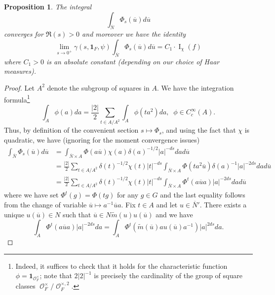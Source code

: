 \documentclass[12pt]{article}
\newtheorem{prop}{Proposition}[section]
\numberwithin{equation}{section}
\def\tm{\widetilde{m}}
\def\ou{\overline{u}}
\def\oN{\overline{N}}
\DeclareMathOperator{\cO}{\mathcal{O}}
\DeclareMathOperator{\rI}{\mathrm{I}}
\begin{document}
	\begin{prop}\label{prop}
		The integral
		\begin{equation}\label{eq4}
			\displaystyle \int_{\oN} \Phi_s(\ou) d\ou
		\end{equation}
		converges for $\Re(s)>0$ and moreover we have the identity
		$$\displaystyle \lim\limits_{s\to 0^+} \gamma(s,\mathbf{1}_F,\psi) \int_{\oN} \Phi_s(\ou)d\ou =C_1 \cdot \rI_{\chi}(f)$$
		where $C_1>0$ is an absolute constant (depending on our choice of Haar measures). 
	\end{prop}
	
	\begin{proof}
		Let $A^2$ denote the subgroup of squares in $A$. We have the integration formula\footnote{Indeed, it suffices to check that it holds for the characteristic function $\phi=\mathbf{1}_{\cO_F^\times}$; note that $2\lvert 2\rvert^{-1}$ is precisely the cardinality of the group of square classes $\cO_F^\times/\cO_F^{\times,2}$.}
		$$\displaystyle \int_A \phi(a)da=\frac{\lvert 2\rvert}{2}\sum_{t\in A/A^2} \int_A \phi(ta^2) da,\;\; \phi\in C_c^\infty(A).$$
		Thus, by definition of the convenient section $s\mapsto \Phi_s$, and using the fact that $\chi$ is quadratic, we have (ignoring for the moment convergence issues)
		\begin{align}\label{eq3}
			\displaystyle \int_{\oN} \Phi_s(\ou) d\ou & =\int_{\oN\times A} \Phi(a\ou) \chi(a)\delta(a)^{-1/2} \lvert a\rvert^{-ds} dad\ou \\
			\nonumber & = \frac{\lvert 2\rvert}{2} \sum_{t\in A/A^2} \delta(t)^{-1/2}\chi(t) \lvert t\rvert^{-ds}\int_{\oN\times A} \Phi(ta^2\ou)\delta(a)^{-1} \lvert a\rvert^{-2ds} dad\ou \\
			\nonumber & = \frac{\lvert 2\rvert}{2}  \sum_{t\in A/A^2} \delta(t)^{-1/2}\chi(t)  \lvert t\rvert^{-ds}\int_{\oN\times A} \Phi^t(a\ou a) \lvert a\rvert^{-2ds} dad\ou
		\end{align}
		where we have set $\Phi^t(g)=\Phi(tg)$ for any $g\in G$ and the last equality follows from the change of variable $\ou\mapsto a^{-1}\ou a$. Fix $t\in A$ and let $u\in \oN'$. There exists a unique $u(\ou)\in N$ such that $\ou\in N \tm(u)u(\ou)$ and we have
		$$\displaystyle \int_A \Phi^t(a\ou a) \lvert a\rvert^{-2ds} da=\int_A \Phi^t(\tm(\ou) a u(\ou)a^{-1}) \lvert a\rvert^{2ds}da.$$

\end{proof}
\end{document}
